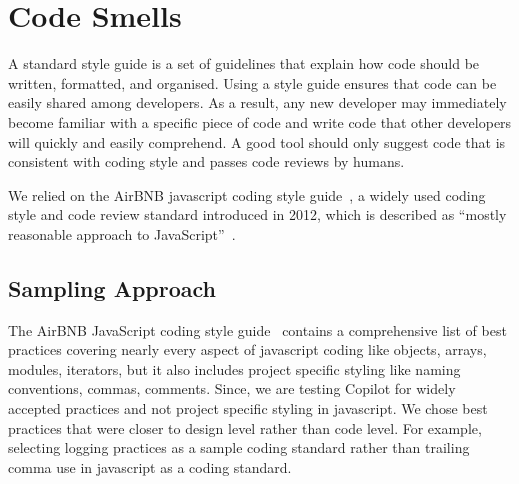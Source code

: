 \section{Code Smells}
\label{smells}
A standard style guide is a set of guidelines that explain how code should be written, formatted, and organised. 
Using a style guide ensures that code can be easily shared among developers. As a result, any new developer may immediately become familiar with a specific piece of code and write code that other developers will quickly and easily comprehend.
A good \cct{} tool should only suggest code that is consistent with coding style and passes code reviews by humans. 

We relied on the AirBNB javascript coding style guide~\cite{airbnb_code}, a widely used coding style and code review standard introduced in 2012, which is described as ``mostly reasonable approach to JavaScript''~\cite{airbnb_code}.


\subsection{Sampling Approach}
\label{smells:sampling}
The AirBNB JavaScript coding style guide~\cite{airbnb_code} contains a comprehensive list of best practices covering nearly every aspect of javascript coding like objects, arrays, modules, iterators, but it also includes project specific styling like naming conventions, commas, comments.
Since, we are testing Copilot for widely accepted practices and not project specific styling in javascript. We chose best practices that were closer to design level rather than code level. For example, selecting logging practices as a sample coding standard rather than trailing comma use in javascript as a coding standard.

